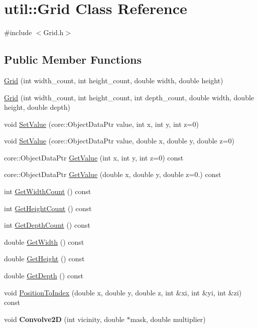 \hypertarget{classutil_1_1Grid}{}\section{util\+:\+:Grid Class Reference}
\label{classutil_1_1Grid}


{\ttfamily \#include $<$Grid.\+h$>$}

\subsection*{Public Member Functions}
\begin{DoxyCompactItemize}
\item 
\hyperlink{classutil_1_1Grid_a0b2bfd0044eb5633a3f1121e5e70709e}{Grid} (int width\+\_\+count, int height\+\_\+count, double width, double height)
\item 
\hyperlink{classutil_1_1Grid_ad6457dda588e20ccd503e363e96dd57e}{Grid} (int width\+\_\+count, int height\+\_\+count, int depth\+\_\+count, double width, double height, double depth)
\item 
void \hyperlink{classutil_1_1Grid_a0e93bd63922e7cbe405176a1ae21877e}{Set\+Value} (core\+::\+Object\+Data\+Ptr value, int x, int y, int z=0)
\item 
void \hyperlink{classutil_1_1Grid_ad7dbf79146d9f5ae1662910b82fd25ea}{Set\+Value} (core\+::\+Object\+Data\+Ptr value, double x, double y, double z=0)
\item 
core\+::\+Object\+Data\+Ptr \hyperlink{classutil_1_1Grid_af464d8381c8e9b6c3088854fc0358dfe}{Get\+Value} (int x, int y, int z=0) const 
\item 
core\+::\+Object\+Data\+Ptr \hyperlink{classutil_1_1Grid_a9171ea7472fdd6010a8065cd9e1c1f06}{Get\+Value} (double x, double y, double z=0.) const 
\item 
int \hyperlink{classutil_1_1Grid_afcc08d36823ea853f6b50a797684c9bc}{Get\+Width\+Count} () const 
\item 
int \hyperlink{classutil_1_1Grid_a2c77cf471457b1af17107a92979b24a2}{Get\+Height\+Count} () const 
\item 
int \hyperlink{classutil_1_1Grid_a330429009107ee0b416dfdbdcbadb5ed}{Get\+Depth\+Count} () const 
\item 
double \hyperlink{classutil_1_1Grid_aa4d14eb145ab9e3ca6c3a4ae606ced37}{Get\+Width} () const 
\item 
double \hyperlink{classutil_1_1Grid_a5e9346d2264a2cf241059428cb6c6bc1}{Get\+Height} () const 
\item 
double \hyperlink{classutil_1_1Grid_a063a8881da7be7919eab6743068232ec}{Get\+Depth} () const 
\item 
void \hyperlink{classutil_1_1Grid_a7fd996135bf881b2ed4565e8c4a9c2e8}{Position\+To\+Index} (double x, double y, double z, int \&xi, int \&yi, int \&zi) const 
\item 
void {\bfseries Convolve2D} (int vicinity, double $\ast$mask, double multiplier)\hypertarget{classutil_1_1Grid_a6597c4f785a764c0b291b8135863fe67}{}\label{classutil_1_1Grid_a6597c4f785a764c0b291b8135863fe67}


\end{DoxyCompactItemize}

